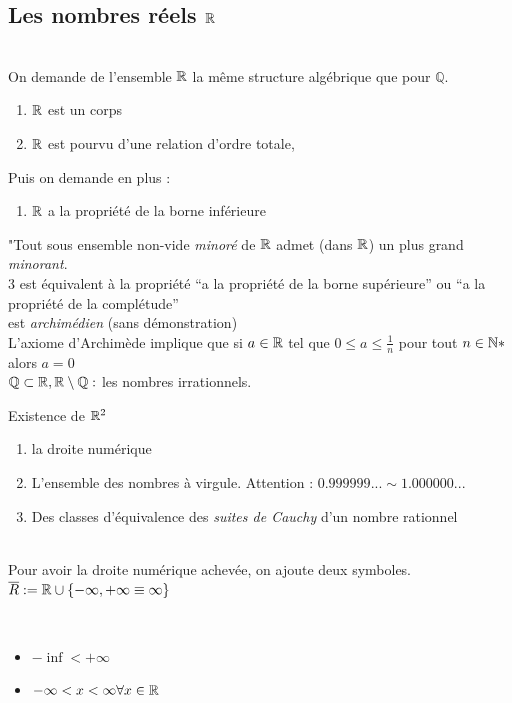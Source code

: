 \documentclass[12pt,a4paper]{article}
\begin{document}
\subsection{Les nombres réels $\mathbb{R}$}
\\
On demande de l'ensemble $\mathbb{R}$ la même structure algébrique que pour $\mathbb{Q}$.
\begin{enumerate}
	\item $\mathbb{R}$ est un corps
	\item $\mathbb{R}$ est pourvu d'une relation d'ordre totale,
\end{enumerate}
Puis on demande en plus :
\begin{enumerate}%
	\item $\mathbb{R}$ a la propriété de la borne inférieure
\end{enumerate}
"Tout sous ensemble non-vide \textit{minoré} de $\mathbb{R}$ admet (dans $\mathbb{R}$) un plus grand \textit{minorant}.\\
 3 est équivalent à la propriété ``\R a la propriété de la borne supérieure'' ou ``\R a la propriété de la complétude''\\
 \R est \textit{archimédien} (sans démonstration)\\
 L'axiome d'Archimède implique que si $a \in \mathbb{R}$ tel que $0\leq a \leq \frac{1}{n}$ pour tout $n \in \mathbb{N}*$ alors $a = 0$\\
 $\mathbb{Q} \subset \mathbb{R}, \mathbb{R} \setminus \mathbb{Q} :$ les nombres irrationnels.\\

{\setlength{\baselineskip}{3pt}
Existence de $\mathbb{R}^2$\\
\begin{enumerate}
	\item la droite numérique
	\item L'ensemble des nombres à virgule. Attention : $0.999999... \sim 1.000000...$
	\item Des classes d'équivalence des \textit{suites de Cauchy} d'un nombre rationnel
\end{enumerate}}
\begin{boite}
\Definition\\
	Pour avoir la droite numérique achevée, on ajoute deux symboles. $\overline{R} := \mathbb{R} \cup \{-\infty, +\infty \equiv \infty\}$
\end{boite}
\\
\begin{itemize}
	\item $-\inf < +\infty$
	\item $-\infty < x < \infty  \forall x \in \mathbb{R}$
\end{itemize}
\end{document}
